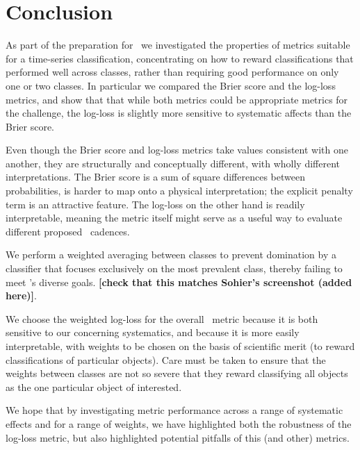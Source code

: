 \section{Conclusion}
\label{sec:conclusion}

As part of the preparation for \plasticc\, we investigated the properties of metrics suitable for a time-series classification, concentrating on how to reward classifications that performed well across classes, rather than requiring good performance on only one or two classes. In particular we compared the Brier score and the log-loss metrics, and show that that while both metrics could be appropriate metrics for the challenge, the log-loss is slightly more sensitive to systematic affects than the Brier score.

% 
Even though the Brier score and log-loss metrics take values consistent with one another, they are structurally and conceptually different, with wholly different interpretations.
The Brier score is a sum of square differences between probabilities, is harder to map onto a physical interpretation; the explicit penalty term is an attractive feature. The log-loss on the other hand is readily interpretable, meaning the metric itself might serve as a useful way to evaluate different proposed \lsst\ cadences.
 

We perform a weighted averaging between classes to prevent domination by a classifier that focuses exclusively on the most prevalent class, thereby failing to meet \plasticc's diverse goals. \textbf{[check that this matches Sohier's screenshot (added here)]}. 

We choose the weighted log-loss for the overall \plasticc\ metric because it is both sensitive to our concerning systematics, and because it is more easily interpretable, with weights to be chosen on the basis of scientific merit (to reward classifications of particular objects). Care must be taken to ensure that the weights between classes are not so severe that they reward classifying all objects as the one particular object of interested.

We hope that by investigating metric performance across a range of systematic effects and for a range of weights, we have highlighted both the robustness of the log-loss metric, but also highlighted potential pitfalls of this (and other) metrics.

